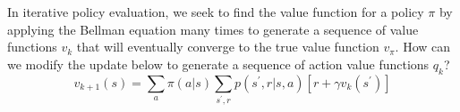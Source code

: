 In iterative policy evaluation, we seek to find the value function for a policy
$\pi$ by applying the Bellman equation many times to generate a sequence of value
functions $v_k$ that will eventually converge to the true value function 
$v_\pi$.
How can we modify the update below to generate a sequence
of action value functions $q_k$?
\[
	v_{k+1}(s) = \sum_a\pi(a|s)\sum_{s^\prime, r}p(s^\prime,r|s,a)\left[r+
	\gamma v_{k}(s^\prime)\right]
\]

